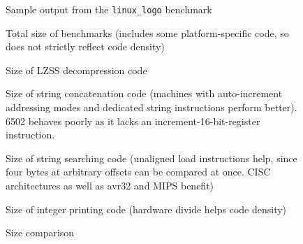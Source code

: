 \documentclass{article}[10pt]
\begin{document}
\begin{figure}[tbp]
  \centering
  \caption{Sample output from the {\tt linux\_logo} benchmark}
  \label{figure:ll}
\end{figure}

%
%

\noindent




\begin{figure}[tbp]
  \centering
  \caption{Total size of benchmarks 
           (includes some platform-specific code, so does not
           strictly reflect code density)}
  \label{figure:total}
\end{figure}

\begin{figure}[tbp]
  \centering
  \caption{Size of LZSS decompression code}
  \label{figure:decomp}
\end{figure}

\begin{figure}[tbp]
  \centering
  \caption{Size of string concatenation code (machines with 
           auto-increment addressing modes and dedicated
           string instructions perform better). 6502 behaves poorly as it
           lacks an increment-16-bit-register instruction.}
  \label{figure:strcat}
\end{figure}

\begin{figure}[tbp]
  \centering
  \caption{Size of string searching code (unaligned load
           instructions help, since four bytes at arbitrary offsets 
           can be compared at once.  
           CISC architectures as well as avr32 and MIPS benefit)}
  \label{figure:findstring}
\end{figure}

\begin{figure}[tbp]
  \centering
  \caption{Size of integer printing code (hardware
           divide helps code density)}
  \label{figure:numascii}
\end{figure}

\begin{figure}[tbp]
  \centering
  \caption{Size comparison}
  \label{figure:libc}
\end{figure}

\pagebreak

{


}
\end{document}
